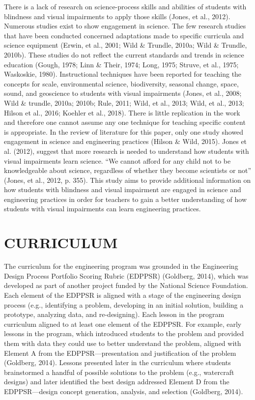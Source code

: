 \documentclass[11.5pt]{sig-alternate} %
\begin{document}
\begin{large}
There is a lack of research on science-process skills and abilities of students with blindness and visual impairments to apply those skills (Jones, et al., 2012). Numerous studies exist to show engagement in science. The few research studies that have been conducted concerned adaptations made to specific curricula and science equipment (Erwin, et al., 2001; Wild \& Trundle, 2010a; Wild \& Trundle, 2010b). These studies do not reflect the current standards and trends in science education (Gough, 1978; Linn \& Their, 1974; Long, 1975; Struve, et al., 1975; Waskoskie, 1980).  Instructional techniques have been reported for teaching the concepts for scale, environmental science, biodiversity, seasonal change, space, sound, and geoscience to students with visual impairments (Jones, et al., 2008; Wild \& trundle, 2010a; 2010b; Rule, 2011; Wild, et al., 2013; Wild, et al., 2013; Hilson et al., 2016; Koehler et al., 2018). There is little replication in the work and therefore one cannot assume any one technique for teaching specific content is appropriate. In the review of literature for this paper, only one study showed engagement in science and engineering practices (Hilson \& Wild, 2015). Jones et al. (2012), suggest that more research is needed to understand how students with visual impairments learn science. “We cannot afford for any child not to be knowledgeable about science, regardless of whether they become scientists or not” (Jones, et al., 2012, p. 355). This study aims to provide additional information on how students with blindness and visual impairment are engaged in science and engineering practices in order for teachers to gain a better understanding of how students with visual impairments can learn engineering practices. 

\section*{CURRICULUM}

The curriculum for the engineering program was grounded in the Engineering Design Process Portfolio Scoring Rubric (EDPPSR) (Goldberg, 2014), which was developed as part of another project funded by the National Science Foundation. Each element of the EDPPSR is aligned with a stage of the engineering design process (e.g., identifying a problem, developing in an initial solution, building a prototype, analyzing data, and re-designing). Each lesson in the program curriculum aligned to at least one element of the EDPPSR. For example, early lessons  in the program, which introduced students to the problem and provided them with data they could use to better understand the problem, aligned with Element A from the EDPPSR—presentation and justification of the problem (Goldberg, 2014). Lessons presented later in the curriculum where students brainstormed a handful of possible solutions to the problem (e.g., watercraft designs) and later identified the best design addressed Element D from the EDPPSR—design concept generation, analysis, and selection (Goldberg, 2014).


\end{large}
\end{document}
